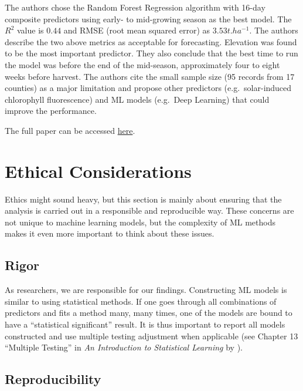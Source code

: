 \documentclass[
]{book}
\begin{document}
The authors chose the Random Forest Regression algorithm with 16-day composite predictors using early- to mid-growing season as the best model. The \(R^2\) value is \(0.44\) and RMSE (root mean squared error) as \(3.53 t.ha^{-1}\). The authors describe the two above metrics as acceptable for forecasting. Elevation was found to be the most important predictor. They also conclude that the best time to run the model was before the end of the mid-season, approximately four to eight weeks before harvest. The authors cite the small sample size (95 records from 17 counties) as a major limitation and propose other predictors (e.g.~solar-induced chlorophyll fluorescence) and ML models (e.g.~Deep Learning) that could improve the performance.

The full paper can be accessed \href{https://essopenarchive.org/users/716273/articles/870897-in-season-sweetpotato-yield-forecasting-using-multitemporal-remote-sensing-environmental-observations-and-machine-learning}{here}.

\hypertarget{ethical-considerations}{%
\chapter{Ethical Considerations}\label{ethical-considerations}}

Ethics might sound heavy, but this section is mainly about ensuring that the analysis is carried out in a responsible and reproducible way. These concerns are not unique to machine learning models, but the complexity of ML methods makes it even more important to think about these issues.

\hypertarget{rigor}{%
\section{Rigor}\label{rigor}}

As researchers, we are responsible for our findings. Constructing ML models is similar to using statistical methods. If one goes through all combinations of predictors and fits a method many, many times, one of the models are bound to have a ``statistical significant'' result. It is thus important to report all models constructed and use multiple testing adjustment when applicable (see Chapter 13 ``Multiple Testing'' in \emph{An Introduction to Statistical Learning} by \citet{james2013introduction}).

\hypertarget{reproducibility}{%
\section{Reproducibility}\label{reproducibility}}
\end{document}
